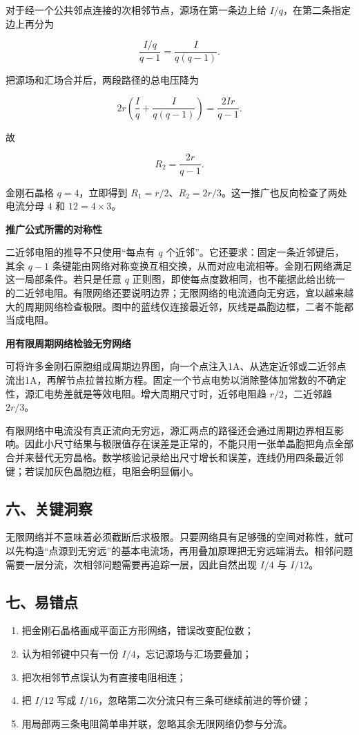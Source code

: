 \documentclass[12pt,a4paper,UTF8]{ctexart}
\newcommand{\tightlist}{\setlength{\itemsep}{0pt}\setlength{\parskip}{0pt}}
\begin{document}
对于经一个公共邻点连接的次相邻节点，源场在第一条边上给
\(I/q\)，在第二条指定边上再分为

\[
\frac{I/q}{q-1}=\frac{I}{q(q-1)}.
\]

把源场和汇场合并后，两段路径的总电压降为

\[
2r\left(\frac Iq+\frac{I}{q(q-1)}\right)
=\frac{2Ir}{q-1}.
\]

故

\[
R_2=\frac{2r}{q-1}.
\]

金刚石晶格 \(q=4\)，立即得到
\(R_1=r/2\)、\(R_2=2r/3\)。这一推广也反向检查了两处电流分母 \(4\) 和
\(12=4\times3\)。

\textbf{推广公式所需的对称性}

二近邻电阻的推导不只使用``每点有 \(q\)
个近邻''。它还要求：固定一条近邻键后，其余 \(q-1\)
条键能由网络对称变换互相交换，从而对应电流相等。金刚石网络满足这一局部条件。若只是任意
\(q\)
正则图，即使每点度数相同，也不能据此给出统一的二近邻电阻。有限网络还要说明边界；无限网络的电流通向无穷远，宜以越来越大的周期网络检查极限。图中的蓝线仅连接最近邻，灰线是晶胞边框，二者不能都当成电阻。

\textbf{用有限周期网络检验无穷网络}

可将许多金刚石原胞组成周期边界图，向一个点注入1A、从选定近邻或二近邻点流出1A，再解节点拉普拉斯方程。固定一个节点电势以消除整体加常数的不确定性，源汇电势差就是等效电阻。增大周期尺寸时，近邻电阻趋
\(r/2\)，二近邻趋 \(2r/3\)。

有限网络中电流没有真正流向无穷远，源汇两点的路径还会通过周期边界相互影响。因此小尺寸结果与极限值存在误差是正常的，不能只用一张单晶胞把角点全部合并来替代无穷晶格。数学核验记录给出尺寸增长和误差，连线仍用四条最近邻键；若误加灰色晶胞边框，电阻会明显偏小。

\subsection{六、关键洞察}\label{ux516dux5173ux952eux6d1eux5bdf-2}

无限网络并不意味着必须截断后求极限。只要网络具有足够强的空间对称性，就可以先构造``点源到无穷远''的基本电流场，再用叠加原理把无穷远端消去。相邻问题需要一层分流，次相邻问题需要再追踪一层，因此自然出现
\(I/4\) 与 \(I/12\)。

\subsection{七、易错点}\label{ux4e03ux6613ux9519ux70b9-2}

\begin{enumerate}
\def\labelenumi{\arabic{enumi}.}
\tightlist
\item
  把金刚石晶格画成平面正方形网络，错误改变配位数；
\item
  认为相邻键中只有一份 \(I/4\)，忘记源场与汇场要叠加；
\item
  把次相邻节点误认为有直接电阻相连；
\item
  把 \(I/12\) 写成 \(I/16\)，忽略第二次分流只有三条可继续前进的等价键；
\item
  用局部两三条电阻简单串并联，忽略其余无限网络仍参与分流。
\end{enumerate}
\end{document}
